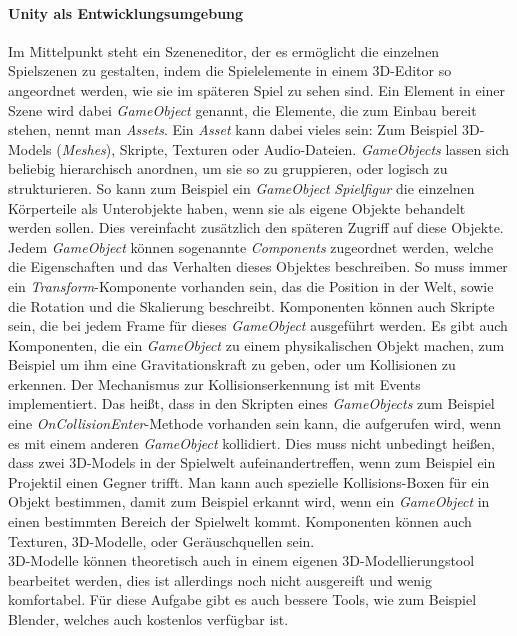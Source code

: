 \paragraph{Unity als Entwicklungsumgebung} Im Mittelpunkt steht ein Szeneneditor, der es ermöglicht die einzelnen Spielszenen zu gestalten, indem die Spielelemente in einem 3D-Editor so angeordnet werden, wie sie im späteren Spiel zu sehen sind. 
Ein Element in einer Szene wird dabei \textit{GameObject} genannt, die Elemente, die zum Einbau bereit stehen, nennt man \textit{Assets}. Ein \textit{Asset} kann dabei vieles sein: Zum Beispiel 3D-Models (\textit{Meshes}), Skripte, Texturen oder Audio-Dateien. \textit{GameObjects} lassen sich beliebig hierarchisch anordnen, um sie so zu gruppieren, oder logisch zu strukturieren. So kann zum Beispiel ein \textit{GameObject} \textit{Spielfigur} die einzelnen Körperteile als Unterobjekte haben, wenn sie als eigene Objekte behandelt werden sollen. Dies vereinfacht zusätzlich den späteren Zugriff auf diese Objekte.\\
Jedem \textit{GameObject} können sogenannte \textit{Components} zugeordnet werden, welche die Eigenschaften und das Verhalten dieses Objektes beschreiben. So muss immer ein \textit{Transform}-Komponente vorhanden sein, das die Position in der Welt, sowie die Rotation und die Skalierung beschreibt. Komponenten können auch Skripte sein, die bei jedem Frame für dieses \textit{GameObject} ausgeführt werden. Es gibt auch Komponenten, die ein \textit{GameObject} zu einem physikalischen Objekt machen, zum Beispiel um ihm eine Gravitationskraft zu geben, oder um Kollisionen zu erkennen. Der Mechanismus zur Kollisionserkennung ist mit Events implementiert. Das heißt, dass in den Skripten eines \textit{GameObjects} zum Beispiel eine \textit{OnCollisionEnter}-Methode vorhanden sein kann, die aufgerufen wird, wenn es mit einem anderen \textit{GameObject} kollidiert. Dies muss nicht unbedingt heißen, dass zwei 3D-Models in der Spielwelt aufeinandertreffen, wenn zum Beispiel ein Projektil einen Gegner trifft. Man kann auch spezielle Kollisions-Boxen für ein Objekt bestimmen, damit zum Beispiel erkannt wird, wenn ein \textit{GameObject} in einen bestimmten Bereich der Spielwelt kommt. Komponenten können auch Texturen, 3D-Modelle, oder Geräuschquellen sein.\\
3D-Modelle können theoretisch auch in einem eigenen 3D-Modellierungstool bearbeitet werden, dies ist allerdings noch nicht ausgereift und wenig komfortabel. Für diese Aufgabe gibt es auch bessere Tools, wie zum Beispiel Blender, welches auch kostenlos verfügbar ist.\\
